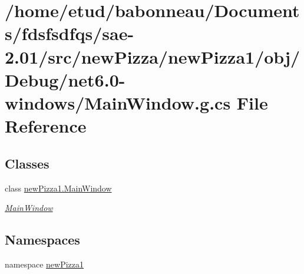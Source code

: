 \hypertarget{Debug_2net6_80-windows_2MainWindow_8g_8cs}{}\section{/home/etud/babonneau/\+Documents/fdsfsdfqs/sae-\/2.01/src/new\+Pizza/new\+Pizza1/obj/\+Debug/net6.0-\/windows/\+Main\+Window.g.\+cs File Reference}
\label{Debug_2net6_80-windows_2MainWindow_8g_8cs}
\subsection*{Classes}
\begin{DoxyCompactItemize}
\item 
class \hyperlink{classnewPizza1_1_1MainWindow}{new\+Pizza1.\+Main\+Window}
\begin{DoxyCompactList}\small\item\em \hyperlink{classnewPizza1_1_1MainWindow}{Main\+Window} \end{DoxyCompactList}\end{DoxyCompactItemize}
\subsection*{Namespaces}
\begin{DoxyCompactItemize}
\item 
namespace \hyperlink{namespacenewPizza1}{new\+Pizza1}
\end{DoxyCompactItemize}
